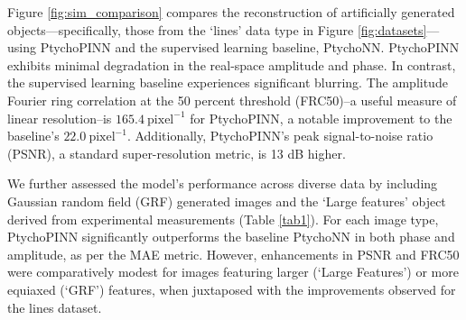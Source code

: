 \documentclass[sn-mathphys]{sn-jnl}%
\theoremstyle{thmstyleone}%
\theoremstyle{thmstyletwo}%
\theoremstyle{thmstylethree}%
\begin{document}
%

Figure \ref{fig:sim_comparison} compares the reconstruction of artificially generated objects—specifically, those from the `lines' data type in Figure \ref{fig:datasets}—using PtychoPINN and the supervised learning baseline, PtychoNN. PtychoPINN exhibits minimal degradation in the real-space amplitude and phase. In contrast, the supervised learning baseline experiences significant blurring. The amplitude Fourier ring correlation at the 50 percent threshold (FRC50)--a useful measure of linear resolution--is $165.4~\mathrm{pixel}^{-1}$ for PtychoPINN, a notable improvement to the baseline's $22.0~\mathrm{pixel}^{-1}$. Additionally, PtychoPINN's peak signal-to-noise ratio (PSNR), a standard super-resolution metric, is 13 dB higher.

We further assessed the model's performance across diverse data by including Gaussian random field (GRF) generated images and the `Large features' object derived from experimental measurements (Table \ref{tab1}). For each image type, PtychoPINN significantly outperforms the baseline PtychoNN in both phase and amplitude, as per the MAE metric. However, enhancements in PSNR and FRC50 were comparatively modest for images featuring larger (`Large Features') or more equiaxed (`GRF') features, when juxtaposed with the improvements observed for the lines dataset.
\end{document}
